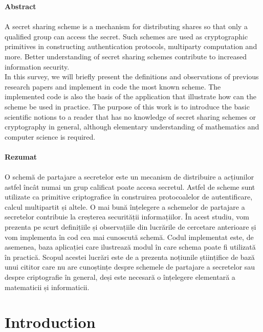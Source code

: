 \documentclass[12pt, a4paper, oneside]{book}
\begin{document}
    \pagestyle{plain}
    \setlength{\parindent}{10pt}
    \hspace{-0.35cm}\textbf{\huge Abstract} 
    \\~\\
    A secret sharing scheme is a mechanism for distributing shares so that only a qualified group can access the secret. Such schemes are used as cryptographic primitives in constructing authentication protocols, multiparty computation and more. Better understanding of secret sharing schemes contribute to increased information security.\\
    In this survey, we will briefly present the definitions and observations of previous research papers and implement in code the most known scheme. The implemented code is also the basis of the application that illustrate how can the scheme be used in practice. The purpose of this work is to introduce the basic scientific notions to a reader that has no knowledge of secret sharing schemes or cryptography in general, although elementary understanding of mathematics and computer science is required.
    \vspace{1cm}
    \\~\\
    \textbf{\huge Rezumat}
    \\~\\
    O schemă de partajare a secretelor este un mecanism de distribuire a acțiunilor astfel încât numai un grup calificat poate accesa secretul. Astfel de scheme sunt utilizate ca primitive criptografice în construirea protocoalelor de autentificare, calcul multipartit și altele. O mai bună înțelegere a schemelor de partajare a secretelor contribuie la creșterea securității informațiilor.
    În acest studiu, vom prezenta pe scurt definițiile și observațiile din lucrările de cercetare anterioare și vom implementa în cod cea mai cunoscută schemă. Codul implementat este, de asemenea, baza aplicației care ilustrează modul în care schema poate fi utilizată în practică. Scopul acestei lucrări este de a prezenta noțiunile științifice de bază unui cititor care nu are cunoștințe despre schemele de partajare a secretelor sau despre criptografie în general, deși este necesară o înțelegere elementară a matematicii și informaticii.
    \chapter{Introduction}
\end{document}
